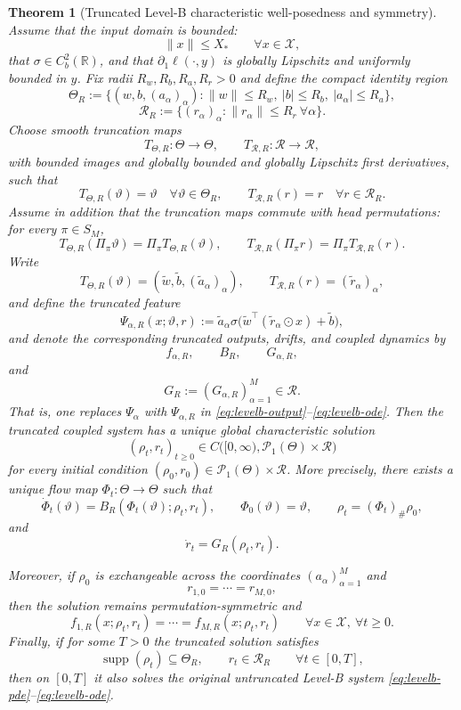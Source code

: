 \documentclass[11pt]{article}
\newtheorem{theorem}{Theorem}[section]
\theoremstyle{definition}
\newcommand{\R}{\mathbb{R}}
\newcommand{\PP}{\mathcal{P}}
\newcommand{\supp}{\operatorname{supp}}
\begin{document}
\begin{theorem}[Truncated Level-B characteristic well-posedness and symmetry]
\label{thm:levelb-wellposed}
Assume that the input domain is bounded:
\[
  \|x\|\le X_*
  \qquad
  \forall x\in \mathcal X,
\]
that $\sigma\in C_b^2(\R)$, and that $\partial_1\ell(\cdot,y)$ is globally Lipschitz and uniformly bounded in $y$.
Fix radii $R_w,R_b,R_a,R_r>0$ and define the compact identity region
\[
  \Theta_R
  :=
  \bigl\{
    (w,b,(a_\alpha)_\alpha):
    \|w\|\le R_w,\ |b|\le R_b,\ |a_\alpha|\le R_a
  \bigr\},
\]
\[
  \mathcal R_R
  :=
  \bigl\{
    (r_\alpha)_\alpha:
    \|r_\alpha\|\le R_r
    \ \forall \alpha
  \bigr\}.
\]
Choose smooth truncation maps
\[
  T_{\Theta,R}:\Theta\to\Theta,
  \qquad
  T_{\mathcal R,R}:\mathcal R\to\mathcal R,
\]
with bounded images and globally bounded and globally Lipschitz first derivatives, such that
\[
  T_{\Theta,R}(\vartheta)=\vartheta
  \quad
  \forall \vartheta\in \Theta_R,
  \qquad
  T_{\mathcal R,R}(r)=r
  \quad
  \forall r\in \mathcal R_R.
\]
Assume in addition that the truncation maps commute with head permutations:
for every $\pi\in S_M$,
\[
  T_{\Theta,R}(\Pi_\pi \vartheta)=\Pi_\pi T_{\Theta,R}(\vartheta),
  \qquad
  T_{\mathcal R,R}(\Pi_\pi r)=\Pi_\pi T_{\mathcal R,R}(r).
\]
Write
\[
  T_{\Theta,R}(\vartheta)=(\widetilde w,\widetilde b,(\widetilde a_\alpha)_\alpha),
  \qquad
  T_{\mathcal R,R}(r)=(\widetilde r_\alpha)_\alpha,
\]
and define the truncated feature
\[
  \Psi_{\alpha,R}(x;\vartheta,r)
  :=
  \widetilde a_\alpha
  \sigma\bigl(\widetilde w^\top(\widetilde r_\alpha\odot x)+\widetilde b\bigr),
\]
and denote the corresponding truncated outputs, drifts, and coupled dynamics by
\[
  f_{\alpha,R},\qquad B_R,\qquad G_{\alpha,R},
\]
and
\[
  G_R:=(G_{\alpha,R})_{\alpha=1}^M\in \mathcal R.
\]
That is, one replaces $\Psi_\alpha$ with $\Psi_{\alpha,R}$ in \eqref{eq:levelb-output}--\eqref{eq:levelb-ode}.
Then the truncated coupled system has a unique global characteristic solution
\[
  (\rho_t,r_t)_{t\ge 0}
  \in
  C\bigl([0,\infty),\PP_1(\Theta)\times \mathcal R\bigr)
\]
for every initial condition $(\rho_0,r_0)\in \PP_1(\Theta)\times \mathcal R$.
More precisely, there exists a unique flow map $\Phi_t:\Theta\to\Theta$ such that
\[
  \dot \Phi_t(\vartheta)=B_R(\Phi_t(\vartheta);\rho_t,r_t),
  \qquad
  \Phi_0(\vartheta)=\vartheta,
  \qquad
  \rho_t=(\Phi_t)_\#\rho_0,
\]
and
\[
  \dot r_t=G_R(\rho_t,r_t).
\]

Moreover, if $\rho_0$ is exchangeable across the coordinates $(a_\alpha)_{\alpha=1}^M$ and
\[
  r_{1,0}=\cdots=r_{M,0},
\]
then the solution remains permutation-symmetric and
\[
  f_{1,R}(x;\rho_t,r_t)=\cdots=f_{M,R}(x;\rho_t,r_t)
  \qquad
  \forall x\in \mathcal X,\ \forall t\ge 0.
\]
Finally, if for some $T>0$ the truncated solution satisfies
\[
  \supp(\rho_t)\subseteq \Theta_R,
  \qquad
  r_t\in \mathcal R_R
  \qquad
  \forall t\in[0,T],
\]
then on $[0,T]$ it also solves the original untruncated Level-B system \eqref{eq:levelb-pde}--\eqref{eq:levelb-ode}.
\end{theorem}
\end{document}
